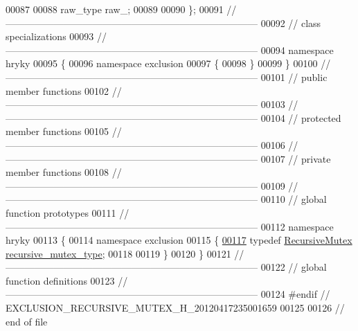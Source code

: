 \begin{DoxyCode}
00087 
00088     raw\_type    raw\_;
00089 
00090 \};
00091 \textcolor{comment}{//
      ------------------------------------------------------------------------------}
00092 \textcolor{comment}{// class specializations}
00093 \textcolor{comment}{//
      ------------------------------------------------------------------------------}
00094 \textcolor{keyword}{namespace }hryky
00095 \{
00096 \textcolor{keyword}{namespace }exclusion
00097 \{
00098 \}
00099 \}
00100 \textcolor{comment}{//
      ------------------------------------------------------------------------------}
00101 \textcolor{comment}{// public member functions}
00102 \textcolor{comment}{//
      ------------------------------------------------------------------------------}
00103 \textcolor{comment}{//
      ------------------------------------------------------------------------------}
00104 \textcolor{comment}{// protected member functions}
00105 \textcolor{comment}{//
      ------------------------------------------------------------------------------}
00106 \textcolor{comment}{//
      ------------------------------------------------------------------------------}
00107 \textcolor{comment}{// private member functions}
00108 \textcolor{comment}{//
      ------------------------------------------------------------------------------}
00109 \textcolor{comment}{//
      ------------------------------------------------------------------------------}
00110 \textcolor{comment}{// global function prototypes}
00111 \textcolor{comment}{//
      ------------------------------------------------------------------------------}
00112 \textcolor{keyword}{namespace }hryky
00113 \{
00114 \textcolor{keyword}{namespace }exclusion
00115 \{
\hypertarget{exclusion__recursive__mutex_8h_source_l00117}{}\hyperlink{namespacehryky_1_1exclusion_a1562883d89e93695e533a4de08782445}{00117}     \textcolor{keyword}{typedef} \hyperlink{classhryky_1_1exclusion_1_1_recursive_mutex}{RecursiveMutex}                      \hyperlink{namespacehryky_1_1exclusion_a1562883d89e93695e533a4de08782445}{recursive_mutex_type};
00118 
00119 \}
00120 \}
00121 \textcolor{comment}{//
      ------------------------------------------------------------------------------}
00122 \textcolor{comment}{// global function definitions}
00123 \textcolor{comment}{//
      ------------------------------------------------------------------------------}
00124 \textcolor{preprocessor}{#endif // EXCLUSION\_RECURSIVE\_MUTEX\_H\_20120417235001659}
00125 \textcolor{preprocessor}{}
00126 \textcolor{comment}{// end of file}
\end{DoxyCode}
